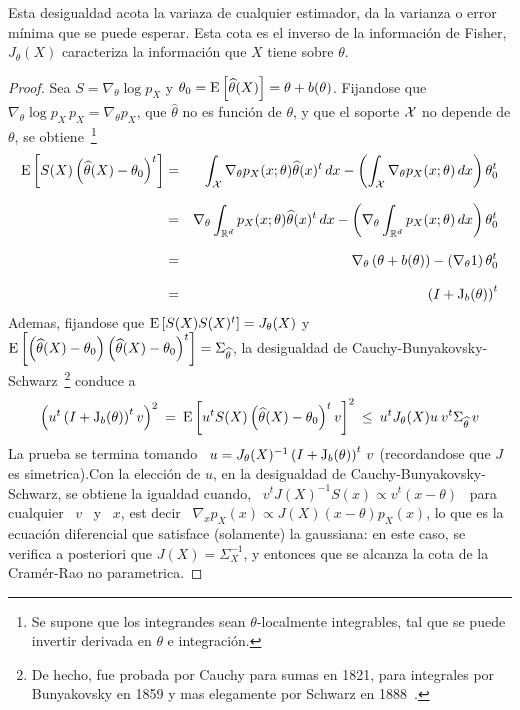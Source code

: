 %
\noindent Esta  desigualdad acota la variaza  de cualquier estimador,  \ie da la
varianza o error  m\'inima que se puede  esperar. Esta cota es el  inverso de la
informaci\'on de Fisher, \ie  $J_\theta(X)$ caracteriza la informaci\'on que $X$
tiene sobre $\theta$.
%
\begin{proof}
  Sea $S = \nabla_\theta \log  p_X$ y $\theta_0 = \operatorname{E}\left[ \widehat{\theta}(X)
  \right] = \theta + b(\theta)$. Fijandose  que $\nabla_\theta \log p_X \, p_X =
  \nabla_\theta p_X$, que $\widehat{\theta}$ no  es funci\'on de $\theta$, y que
  el soporte $\mathcal{X}$ no depende de $\theta$, se obtiene~\footnote{Se supone que los
    integrandes sean $\theta$-localmente integrables,  tal que se puede invertir
    derivada en $\theta$ e integraci\'on.}
  \begin{eqnarray*}
  \operatorname{E}\left[ S(X) \left( \widehat{\theta}(X) - \theta_0 \right)^t \right] & = &
  \int_{\mathcal{X}} \nabla_\theta p_X(x;\theta) \widehat{\theta}(x)^t \, dx - \left(
  \int_{\mathcal{X}} \nabla_\theta p_X(x;\theta) \, dx \right) \theta_0^t\\[2.5mm]
  & = & \nabla_\theta \int_{\mathbb{R}^d} p_X(x;\theta) \widehat{\theta}(x)^t \, dx -
  \left( \nabla_\theta \int_{\mathbb{R}^d} p_X(x;\theta) \, dx \right)
  \theta_0^t\\[2.5mm]
  & = & \nabla_\theta \left( \theta + b(\theta) \right)  - 
  \left( \nabla_\theta 1 \right) \theta_0^t\\[2.5mm]
  & = & \left( I + \operatorname{J}_b(\theta) \right)^t
  \end{eqnarray*}
  Ademas,  fijandose  que  $\operatorname{E}\left[  S(X)  S(X)^t \right]  =  J_\theta(X)$  y
  $\operatorname{E}\left[   \left(    \widehat{\theta}(X)   -   \theta_0    \right)   \left(
      \widehat{\theta}(X)      -      \theta_0      \right)^t     \right]      =
  \Sigma_{\widehat{\theta}}$,            la            desigualdad            de
  Cauchy-Bunyakovsky-Schwarz~\footnote{De  hecho, fue  probada  por Cauchy  para
    sumas en 1821, para integrales por  Bunyakovsky en 1859 y mas elegamente por
    Schwarz  en  1888~\cite{Ste04}.}   conduce  a
  \[
  \left( u^t \left( I + \operatorname{J}_b(\theta)  \right)^t v \right)^2 \: = \: \operatorname{E}\left[
    u^t S(X) \left( \widehat{\theta}(X) -  \theta_0 \right)^t v \right]^2 \: \le
  \: u^t J_\theta(X) u \: v^t \Sigma_{\widehat{\theta}} \, v
  \]
  La prueba se termina tomando \ $u = J_\theta(X)^{-1} \left( I + \operatorname{J}_b(\theta)
  \right)^t \, v$ (recordandose que $J$ es simetrica).\newline Con la elecci\'on
  de  $u$,  en  la  desigualdad  de Cauchy-Bunyakovsky-Schwarz,  se  obtiene  la
  igualdad  cuando, \  $v^t J(X)^{-1}  S(x)  \propto v^t  (x -  \theta)$ \  para
  cualquier \  $v$ \ y \  $x$, est decir \  $\nabla_x p_X (x) \propto  J(X) (x -
  \theta) p_X(x)$, lo que es la ecuaci\'on diferencial que satisface (solamente)
  la  gaussiana:   en  este  caso,  se   verifica  a  posteriori   que  $J(X)  =
  \Sigma_X^{-1}$,  y entonces  que  se alcanza  la  cota de  la Cram\'er-Rao  no
  parametrica.
\end{proof}
